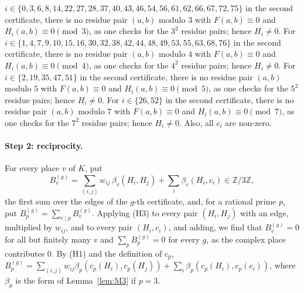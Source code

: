 \documentclass[11pt]{article}
\newcommand{\Z}{\mathbb{Z}}
\begin{document}
$i\in\{0,\allowbreak 3,\allowbreak 6,\allowbreak 8,\allowbreak 14,\allowbreak 22,\allowbreak 27,\allowbreak 28,\allowbreak 37,\allowbreak 40,\allowbreak 43,\allowbreak 46,\allowbreak 54,\allowbreak 56,\allowbreak 61,\allowbreak 62,\allowbreak 66,\allowbreak 67,\allowbreak 72,\allowbreak 75\}$ in the second certificate, there is no residue pair $(a,b)$ modulo $3$ with $F(a,b)\equiv0$ and $H_i(a,b)\equiv0\pmod{3}$, as one checks for the $3^2$ residue pairs; hence $H_i\neq0$. For $i\in\{1,\allowbreak 4,\allowbreak 7,\allowbreak 9,\allowbreak 10,\allowbreak 15,\allowbreak 16,\allowbreak 30,\allowbreak 32,\allowbreak 38,\allowbreak 42,\allowbreak 44,\allowbreak 48,\allowbreak 49,\allowbreak 53,\allowbreak 55,\allowbreak 63,\allowbreak 68,\allowbreak 76\}$ in the second certificate, there is no residue pair $(a,b)$ modulo $4$ with $F(a,b)\equiv0$ and $H_i(a,b)\equiv0\pmod{4}$, as one checks for the $4^2$ residue pairs; hence $H_i\neq0$. For $i\in\{2,\allowbreak 19,\allowbreak 35,\allowbreak 47,\allowbreak 51\}$ in the second certificate, there is no residue pair $(a,b)$ modulo $5$ with $F(a,b)\equiv0$ and $H_i(a,b)\equiv0\pmod{5}$, as one checks for the $5^2$ residue pairs; hence $H_i\neq0$. For $i\in\{26,\allowbreak 52\}$ in the second certificate, there is no residue pair $(a,b)$ modulo $7$ with $F(a,b)\equiv0$ and $H_i(a,b)\equiv0\pmod{7}$, as one checks for the $7^2$ residue pairs; hence $H_i\neq0$. Also, all $c_i$ are non-zero.

\paragraph{Step 2: reciprocity.} For every place $v$ of $K$, put
\begin{equation}\label{eq:B}
B^{(g)}_v=\sum_{(i,j)}w_{ij}\,\beta_v(H_i,H_j)+\sum_i\beta_v(H_i,c_i)\in\Z/3\Z,
\end{equation}
the first sum over the edges of the $g$-th certificate, and, for a rational prime $p$, put $B^{(g)}_p=\sum_{v\mid p}B^{(g)}_v$. Applying (H3) to every pair $(H_i,H_j)$ with an edge, multiplied by $w_{ij}$, and to every pair $(H_i,c_i)$, and adding, we find that $B^{(g)}_v=0$ for all but finitely many $v$ and $\sum_pB^{(g)}_p=0$ for every $g$, as the complex place contributes $0$. By (H1) and the definition of $c_p$, $B^{(g)}_p=\sum_{(i,j)}w_{ij}\beta_p(c_p(H_i),c_p(H_j))+\sum_i\beta_p(c_p(H_i),c_p(c_i))$, where $\beta_p$ is the form of Lemma~\ref{lem:M3} if $p=3$.
\end{document}
